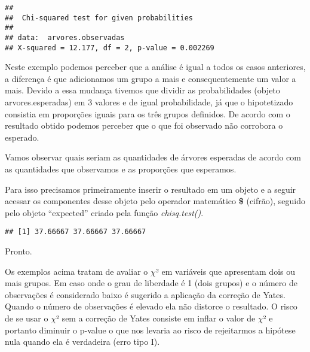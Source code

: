 \documentclass[titlepage, oneside, openany, a4paper]{book}
\newenvironment{Shaded}{\begin{snugshade}}{\end{snugshade}}
\newcommand{\DataTypeTok}[1]{\textcolor[rgb]{0.13,0.29,0.53}{#1}}
\newcommand{\KeywordTok}[1]{\textcolor[rgb]{0.13,0.29,0.53}{\textbf{#1}}}
\newcommand{\NormalTok}[1]{#1}
\newcommand{\OperatorTok}[1]{\textcolor[rgb]{0.81,0.36,0.00}{\textbf{#1}}}
\newcommand{\StringTok}[1]{\textcolor[rgb]{0.31,0.60,0.02}{#1}}
\begin{document}
\begin{verbatim}
## 
##  Chi-squared test for given probabilities
## 
## data:  arvores.observadas
## X-squared = 12.177, df = 2, p-value = 0.002269
\end{verbatim}

Neste exemplo podemos perceber que a análise é igual a todos os casos anteriores, a diferença é que adicionamos um grupo a mais e consequentemente um valor a mais. Devido a essa mudança tivemos que dividir as probabilidades (objeto arvores.esperadas) em 3 valores e de igual probabilidade, já que o hipotetizado consistia em proporções iguais para os três grupos definidos. De acordo com o resultado obtido podemos perceber que o que foi observado não corrobora o esperado.

Vamos observar quais seriam as quantidades de árvores esperadas de acordo com as quantidades que observamos e as proporções que esperamos.

Para isso precisamos primeiramente inserir o resultado em um objeto e a seguir acessar os componentes desse objeto pelo operador matemático \textbf{\$} (cifrão), seguido pelo objeto ``expected'' criado pela função \emph{chisq.test()}.

\begin{Shaded}
\end{Shaded}

\begin{verbatim}
## [1] 37.66667 37.66667 37.66667
\end{verbatim}

Pronto.

Os exemplos acima tratam de avaliar o \(\chi\)² em variáveis que apresentam dois ou mais grupos. Em caso onde o grau de liberdade é 1 (dois grupos) e o número de observações é considerado baixo é sugerido a aplicação da correção de Yates. Quando o número de observações é elevado ela não distorce o resultado. O risco de se usar o \(\chi\)² sem a correção de Yates consiste em inflar o valor de \(\chi\)² e portanto diminuir o p-value o que nos levaria ao risco de rejeitarmos a hipótese nula quando ela é verdadeira (erro tipo I).
\end{document}
